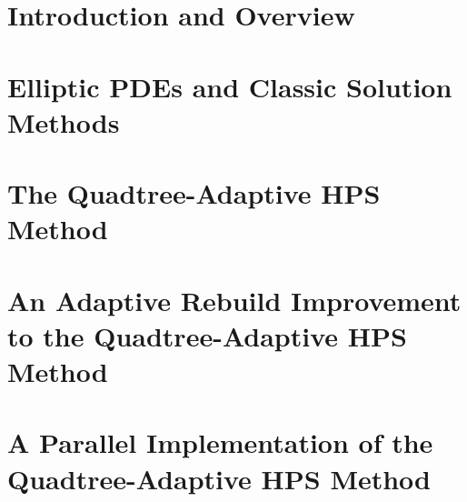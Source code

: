 \documentclass[12pt,twoside]{report}
\begin{document}

\begintext
\chapter{Introduction and Overview}
\label{chap:intro}





\chapter{Elliptic PDEs and Classic Solution Methods}
\label{chap:elliptic-pdes}




\chapter{The Quadtree-Adaptive HPS Method}
\label{chap:qahps}






\chapter{An Adaptive Rebuild Improvement to the Quadtree-Adaptive HPS Method}
\label{chap:adaptive-build}






\chapter{A Parallel Implementation of the Quadtree-Adaptive HPS Method}
\label{chap:parallel}





\end{document}
